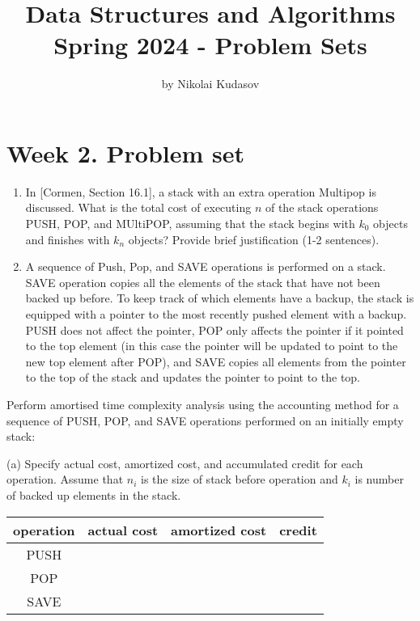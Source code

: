 \documentclass[10pt]{article}
\title{Data Structures and Algorithms Spring 2024 - Problem Sets }
\author{by Nikolai Kudasov}
\begin{document}
\maketitle


\section*{Week 2. Problem set}
\begin{enumerate}
  \item In [Cormen, Section 16.1], a stack with an extra operation Multipop is discussed. What is the total cost of executing $n$ of the stack operations PUSH, POP, and MUltiPOP, assuming that the stack begins with $k_{0}$ objects and finishes with $k_{n}$ objects? Provide brief justification (1-2 sentences).

  \item A sequence of Push, Pop, and SAVE operations is performed on a stack. SAVE operation copies all the elements of the stack that have not been backed up before. To keep track of which elements have a backup, the stack is equipped with a pointer to the most recently pushed element with a backup. PUSH does not affect the pointer, POP only affects the pointer if it pointed to the top element (in this case the pointer will be updated to point to the new top element after POP), and SAVE copies all elements from the pointer to the top of the stack and updates the pointer to point to the top.

\end{enumerate}

Perform amortised time complexity analysis using the accounting method for a sequence of PUSH, POP, and SAVE operations performed on an initially empty stack:

(a) Specify actual cost, amortized cost, and accumulated credit for each operation. Assume that $n_{i}$ is the size of stack before operation and $k_{i}$ is number of backed up elements in the stack.

\begin{center}
\begin{tabular}{|c||c|c|c|}
\hline
operation & actual cost & amortized cost & credit \\
\hline\hline
PUSH &  &  &  \\
\hline
POP &  &  &  \\
\hline
SAVE &  &  &  \\
\hline
\end{tabular}
\end{center}
\end{document}
